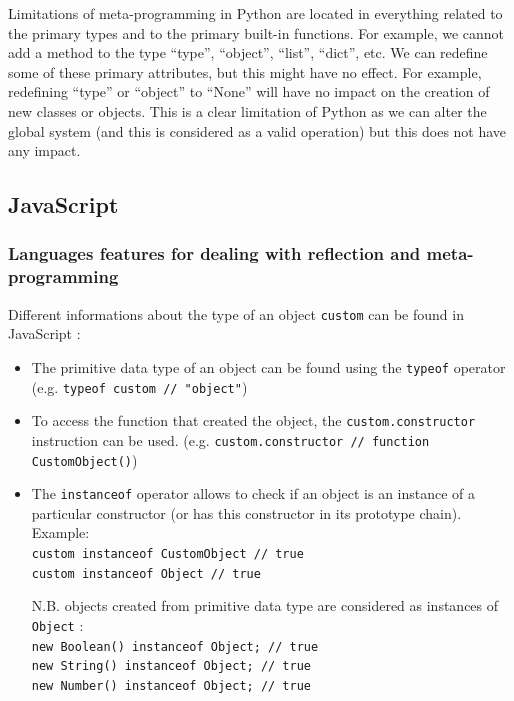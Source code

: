 \documentclass[a4paper,10pt]{article}
\begin{document}
Limitations of meta-programming in Python are located in everything related to the primary types and to the primary built-in functions.
For example, we cannot add a method to the type ``type'', ``object'', ``list'', ``dict'', etc.
We can redefine some of these primary attributes, but this might have no effect.
For example, redefining ``type'' or ``object'' to ``None'' will have no impact on the creation of new classes or objects.
This is a clear limitation of Python as we can alter the global system (and this is considered as a valid operation) but this does not have any impact.



\newpage
\subsection{JavaScript}

\setjs
\subsubsection{Languages features for dealing with reflection and meta-programming}

Different informations about the type of an object \lstinline|custom| can be found in JavaScript :
\begin{itemize}
\item The primitive data type of an object can be found using the \lstinline|typeof| operator (e.g. \lstinline|typeof custom // "object"|)

\item To access the function that created the object, the \lstinline|custom.constructor| instruction can be used. (e.g. \lstinline|custom.constructor // function CustomObject()|)

\item The \lstinline|instanceof| operator allows to check if an object is an instance of a particular constructor (or has this constructor in its prototype chain). \\
		Example: \\
		\lstinline|custom instanceof CustomObject // true| \\
		\lstinline|custom instanceof Object // true|

		\smallskip
		N.B. objects created from primitive data type are considered as instances of \lstinline|Object| : \\
		\lstinline|new Boolean() instanceof Object; // true| \\
		\lstinline|new String() instanceof Object; // true| \\
		\lstinline|new Number() instanceof Object; // true| \\
\end{itemize}
\end{document}
